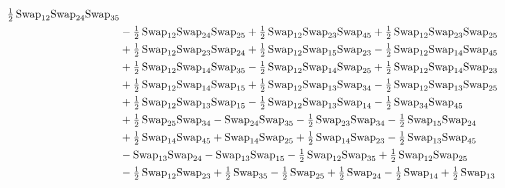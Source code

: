 \documentclass[12pt,dvipsnames,accepted=2016-08-18,a4paper,onecolumn]{quantumarticle}
\numberwithin{equation}{section}
\theoremstyle{definition}
\begin{document}
\begin{align*}
        \tfrac12\,\textnormal{Swap}_{12} \textnormal{Swap}_{24} \textnormal{Swap}_{35}\\ & - \tfrac12\,\textnormal{Swap}_{12} \textnormal{Swap}_{24} \textnormal{Swap}_{25} + \tfrac12\,\textnormal{Swap}_{12} \textnormal{Swap}_{23} \textnormal{Swap}_{45} + \tfrac12\,\textnormal{Swap}_{12} \textnormal{Swap}_{23} \textnormal{Swap}_{25}\\ & +
        \tfrac12\,\textnormal{Swap}_{12} \textnormal{Swap}_{23} \textnormal{Swap}_{24} + \tfrac12\,\textnormal{Swap}_{12} \textnormal{Swap}_{15} \textnormal{Swap}_{23} - \tfrac12\,\textnormal{Swap}_{12} \textnormal{Swap}_{14} \textnormal{Swap}_{45}\\ & + \tfrac12\,\textnormal{Swap}_{12} \textnormal{Swap}_{14} \textnormal{Swap}_{35} -
        \tfrac12\,\textnormal{Swap}_{12} \textnormal{Swap}_{14} \textnormal{Swap}_{25} + \tfrac12\,\textnormal{Swap}_{12} \textnormal{Swap}_{14} \textnormal{Swap}_{23}\\ & + \tfrac12\,\textnormal{Swap}_{12} \textnormal{Swap}_{14} \textnormal{Swap}_{15} + \tfrac12\,\textnormal{Swap}_{12} \textnormal{Swap}_{13} \textnormal{Swap}_{34} -
        \tfrac12\,\textnormal{Swap}_{12} \textnormal{Swap}_{13} \textnormal{Swap}_{25}\\ & + \tfrac12\,\textnormal{Swap}_{12} \textnormal{Swap}_{13} \textnormal{Swap}_{15} - \tfrac12\,\textnormal{Swap}_{12} \textnormal{Swap}_{13} \textnormal{Swap}_{14} - \tfrac12\,\textnormal{Swap}_{34} \textnormal{Swap}_{45}\\ & +
        \tfrac12\,\textnormal{Swap}_{25} \textnormal{Swap}_{34} - \textnormal{Swap}_{24} \textnormal{Swap}_{35} - \tfrac12\,\textnormal{Swap}_{23} \textnormal{Swap}_{34} - \tfrac12\,\textnormal{Swap}_{15} \textnormal{Swap}_{24}\\ & + \tfrac12\,\textnormal{Swap}_{14} \textnormal{Swap}_{45} +
        \textnormal{Swap}_{14} \textnormal{Swap}_{25} + \tfrac12\,\textnormal{Swap}_{14} \textnormal{Swap}_{23} - \tfrac12\,\textnormal{Swap}_{13} \textnormal{Swap}_{45}\\ & - \textnormal{Swap}_{13} \textnormal{Swap}_{24} - \textnormal{Swap}_{13} \textnormal{Swap}_{15} - \tfrac12\,\textnormal{Swap}_{12} \textnormal{Swap}_{35} +
        \tfrac12\,\textnormal{Swap}_{12} \textnormal{Swap}_{25}\\ & - \tfrac12\,\textnormal{Swap}_{12} \textnormal{Swap}_{23} + \tfrac12\,\textnormal{Swap}_{35} - \tfrac12\,\textnormal{Swap}_{25} + \tfrac12\,\textnormal{Swap}_{24} - \tfrac12\,\textnormal{Swap}_{14} +
        \tfrac12\,\textnormal{Swap}_{13}\\

\end{align*}
\end{document}
